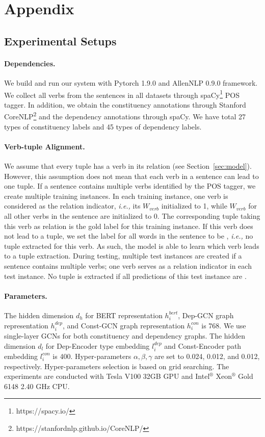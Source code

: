 \documentclass[11pt]{article}
\newcommand{\ie}{\emph{i.e.,}\xspace}
\begin{document}
\appendix

\section{Appendix}
\label{Sec:appendix}



\subsection{Experimental Setups}
\label{sec:expSetup}


\paragraph{Dependencies.} We build and run our system with Pytorch 1.9.0 and AllenNLP 0.9.0 framework. We collect all verbs from the sentences in all datasets through spaCy\footnote{https://spacy.io/} POS tagger.
In addition, we obtain the constituency annotations through Stanford CoreNLP\footnote{https://stanfordnlp.github.io/CoreNLP/} and the dependency annotations through spaCy. We have total 27 types of constituency labels and 45 types of dependency labels.

\paragraph{Verb-tuple Alignment.}
We assume that every tuple has a verb in its relation (see Section~\ref{sec:model}). However, this assumption does not mean that each verb in a sentence can lead to one tuple. 
If a sentence contains multiple verbs identified by the POS tagger, we create multiple training instances. In each training instance, one verb is considered as the relation indicator, \ie its $W_{verb}$ initialized to 1, while $W_{verb}$ for all other verbs in the sentence are initialized to 0. The corresponding tuple taking this verb as relation is the gold label for this training instance. If this verb does not lead to a tuple, we set the label for all words in the sentence to be , \ie no tuple extracted for this verb. As such, the model is able to learn which verb leads to a tuple extraction. During testing, multiple test instances are created if a sentence contains multiple verbs; one verb serves as a relation indicator in each test instance. No tuple is extracted if all predictions of this test instance are .


\paragraph{Parameters.}
The hidden dimension $d_h$ for BERT representation $h_i^{bert}$, Dep-GCN graph representation $h_i^{dep}$, and Const-GCN graph representation $h_i^{con}$ is 768. We use single-layer GCNs for both constituency and dependency graphs. The hidden dimension $d_l$ for Dep-Encoder type embedding $l_i^{dep}$ and Const-Encoder path embedding $l_i^{con}$ is 400. Hyper-parameters $\alpha, \beta,  \gamma$ are set to 0.024, 0.012, and 0.012, respectively. Hyper-parameters selection is based on grid searching. The experiments are conducted with Tesla V100 32GB GPU and Intel$^\circledR$  Xeon$^\circledR$ Gold 6148 2.40 GHz CPU.
\end{document}
